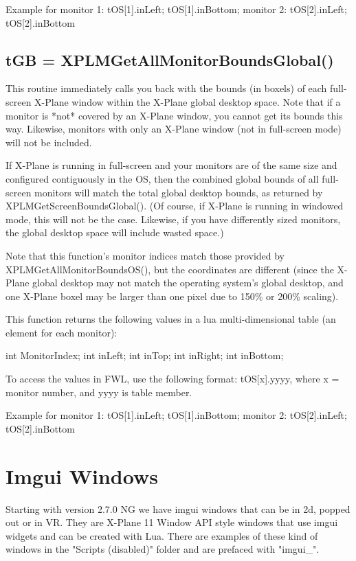 \documentclass[11pt,parskip=half,a4paper]{scrartcl}
\begin{document}
Example for monitor 1: tOS[1].inLeft; tOS[1].inBottom; monitor 2: tOS[2].inLeft; tOS[2].inBottom 

\subsection{\hspace*{1.0mm}tGB = XPLMGetAllMonitorBoundsGlobal()}

This routine immediately calls you back with the bounds (in boxels) of each full-screen X-Plane window within the X-Plane global desktop space. Note that if a monitor is *not* covered by an X-Plane window, you cannot get its bounds this way. Likewise, monitors with only an X-Plane window (not in full-screen mode) will not be included.

If X-Plane is running in full-screen and your monitors are of the same size and configured contiguously in the OS, then the combined global bounds of all full-screen monitors will match the total global desktop bounds, as returned by XPLMGetScreenBoundsGlobal(). (Of course, if X-Plane is running in windowed mode, this will not be the case. Likewise, if you have differently sized monitors, the global desktop space will include wasted space.)

Note that this function's monitor indices match those provided by XPLMGetAllMonitorBoundsOS(), but the coordinates are different (since the X-Plane global desktop may not match the operating system's global desktop, and one X-Plane boxel may be larger than one pixel due to 150\% or 200\% scaling).

This function returns the following values in a lua multi-dimensional table (an element for each monitor):

    int        MonitorIndex;
    int        inLeft;
    int        inTop;
    int        inRight;
    int        inBottom;
 

To access the values in FWL, use the following format: tOS[x].yyyy, where x = monitor number, and yyyy is table member.

Example for monitor 1: tOS[1].inLeft; tOS[1].inBottom; monitor 2: tOS[2].inLeft; tOS[2].inBottom  

\newpage
\section{Imgui Windows}

Starting with version 2.7.0 NG we have imgui windows that can be in 2d, popped out or in VR. They are X-Plane 11 Window API style windows that use imgui widgets and can be created with Lua. There are examples of these kind of windows in the "Scripts (disabled)" folder and are prefaced with "imgui\_".
\end{document}
